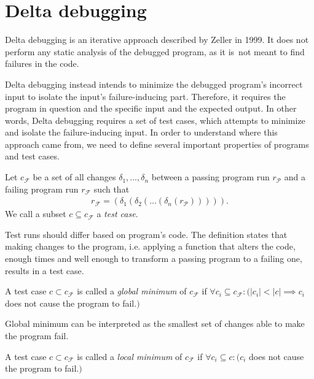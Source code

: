 \section{Delta debugging}

Delta debugging is an iterative approach described by Zeller in 1999. 
It does not perform any static analysis of the debugged program, as it 
is~not meant to find failures in the code. 

Delta debugging instead intends to 
minimize the debugged program's incorrect input to isolate the input's 
failure-inducing part. 
Therefore, it requires the program in question and the specific input 
and the expected output. 
In other words, Delta debugging requires a set of test cases, which attempts to 
minimize and isolate the failure-inducing input. 
In order to understand where
this app\-roach came from, we need to define several important properties of 
programs and test cases.

\begin{defn}\label{def02:1}
  Let $c_\mathcal{F}$ be a set of all changes $\delta_1,\dots,\delta_n$ 
  between a passing program run $r_\mathcal{P}$ and a failing program run
  $r_\mathcal{F}$ such that 
  \begin{align}
	r_\mathcal{F} = (\delta_1(\delta_2(\dots(\delta_n(r_\mathcal{P}))))). \nonumber 
  \end{align}
  We call a subset $c \subseteq c_\mathcal{F}$ a \emph{test case}.
\end{defn}

Test runs should differ based on program's code. 
The definition states that making changes to the program,
i.e. applying a function that alters the code, enough times
and well enough to transform a passing program to a failing one,
results in a test case.

\begin{defn}\label{def02:2}
  A test case $c \subset c_\mathcal{F}$ is called a \emph{global minimum}
  of $c_\mathcal{F}$ if $\forall c_i \subseteq c_\mathcal{F}:
  (|c_i| < |c| \implies c_i$ does not cause the program to fail.$)$
\end{defn}

Global minimum can be interpreted as the smallest set of changes able to
make the program fail.

\begin{defn}\label{def02:3}
  A test case $c \subset c_\mathcal{F}$ is called a \emph{local minimum}
  of $c_\mathcal{F}$ if $\forall c_i \subseteq c:
  (c_i$ does not cause the program to fail.$)$
\end{defn}

